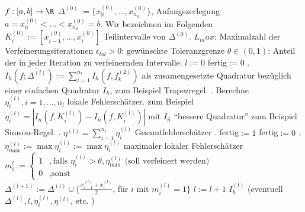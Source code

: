 \documentclass[11pt]{scrbook}
\begin{document}
\begin{alg*}
	\begin{algorithmic}
		\Require $f:[a,b]\to \R$
		\Require $\Delta^{(0)}:=\{x_0^{(0)},..., x_{n_0}^{(0)}\}$, Anfangszerlegung $a=x_0^{(0)}<...<x_{n_0}^{(0)}=b$. 
		Wir bezeichnen im Folgenden $K_i^{(0)}:=[x_{i-1}^{(0)},..., x_{i}^{(0)}]$ Teilintervalle von $\Delta^{(0)}$.
		\Require $L_max$: Maximalzahl der Verfeinerungsiterationen
		\Require $\epsilon_{tol}>0$: gewünschte Toleranzgrenze
		\Require $\theta\in (0,1)$: Anteil der in jeder Iteration zu verfeinernden Intervalle.
		\State $l:=0$
		\State fertig$:= 0$ %
		. $I_h(f; \Delta^{(l)}):= \sum_{i=1}^{n_l} I_h (f, f_{k}^{(2)})$ als zusamengesetzte Quadratur bezüglich einer einfachen Quadratur $I_h$, zum Beispiel Trapezregel.
		. Berechne $\eta_i^{(l)}, i=1,..., n_l$ lokale Fehlerschätzer. zum Beispiel $\eta_i^{(l)}=|I_n(f, K_i^{(l)})- I_{\hat n} (f, K_i^{(l)})|$ mit $I_{\hat n}$ "`bessere Quadratur"' zum Beispiel Simson-Regel.
		. $\eta^{(l)}=\sum_{i=1}^{n_l} \eta_i^{(l)}$ Gesamtfehlerschätzer
		.
		 fertig$:= 1$ \Else fertig$:=0$ \EndIf
		. 
		\State $\eta_{max}^{(l)}:= \max \eta_i^{(l)}:= \max \eta_i^{(l)}$ maximaler lokaler Fehlerschätzer
		\State $m_i^{l}:=\begin{cases} 1 &, \text{falls $\eta_i^{(l)}>\theta, \eta_{\max}^{(l)}$ (soll verfeinert werden)}\\ 0 &, \text{sonst}\end{cases}$
		\State $\Delta^{(l+1)}:= \Delta^{(l)} \cup \{ \frac{x_{i-1}^{(l)}+x_{i}^{(l)}}{2}$, für $i$ mit $m_i^{(l)}=1\}$
		\State $l:=l+1$
		\EndIf 
		\EndWhile
		\Return $I_h^{(l)}$ (eventuell $\Delta^{(l)}, l, \eta_i^{(l)}, \eta^{(l)}$, etc. )
	\end{algorithmic}
\end{alg*}
\end{document}
